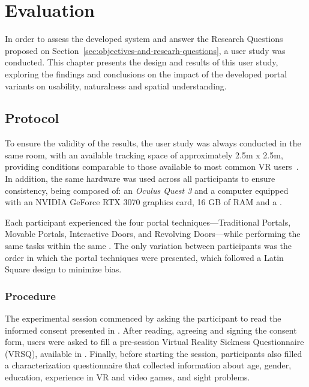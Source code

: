 
%

\chapter{Evaluation}
\label{cha:evaluation}

In order to assess the developed system and answer the Research Questions proposed on Section~\ref{sec:objectives-and-researh-questions},
a user study was conducted. This chapter presents the design and results of this user study, exploring the findings and conclusions on 
the impact of the developed portal variants on usability, naturalness and spatial understanding.


\section{Protocol}
\label{sec:protocol}

To ensure the validity of the results, the user study was always conducted in the same room, with an available tracking space of 
approximately 2.5m x 2.5m, providing conditions comparable to those available to most common \gls{VR} users~\cite{}. In addition, 
the same hardware was used across all participants to ensure consistency, being composed of: an \textit{Oculus Quest 3}  and 
a computer equipped with an NVIDIA GeForce RTX 3070 graphics card, 16 GB of RAM and a .

Each participant experienced the four portal 
techniques—Traditional Portals, Movable Portals, Interactive Doors, and Revolving Doors—while performing the same tasks within 
the same . The only variation between participants was the order in which the portal techniques were presented, which 
followed a Latin Square design to minimize bias.

\subsection{Procedure}
\label{sec:procedure}

The experimental session commenced by asking the participant to read the informed consent presented in . After reading, 
agreeing and signing the consent form, users were asked to fill a pre-session Virtual Reality Sickness Questionnaire (VRSQ), available in 
. Finally, before starting the session, participants also filled a characterization questionnaire that collected 
information about age, gender, education, experience in VR and video games, and sight problems.

